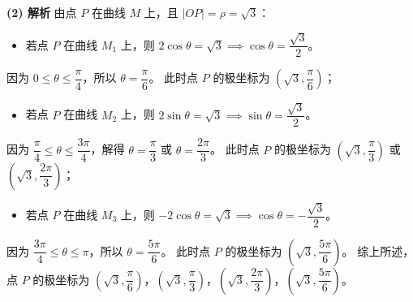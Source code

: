 \begin{answer}
\textbf{(2) 解析}
由点 $P$ 在曲线 $M$ 上，且 $|OP| = \rho = \sqrt{3}$：
\begin{itemize}
\item 若点 $P$ 在曲线 $M_1$ 上，则 $2\cos\theta = \sqrt{3} \implies \cos\theta = \dfrac{\sqrt{3}}{2}$。
\end{itemize}
  因为 $0 \leqslant \theta \leqslant \dfrac{\pi}{4}$，所以 $\theta = \dfrac{\pi}{6}$。
  此时点 $P$ 的极坐标为 $\left(\sqrt{3}, \dfrac{\pi}{6}\right)$；
\begin{itemize}
\item 若点 $P$ 在曲线 $M_2$ 上，则 $2\sin\theta = \sqrt{3} \implies \sin\theta = \dfrac{\sqrt{3}}{2}$。
\end{itemize}
  因为 $\dfrac{\pi}{4} \leqslant \theta \leqslant \dfrac{3\pi}{4}$，解得 $\theta = \dfrac{\pi}{3}$ 或 $\theta = \dfrac{2\pi}{3}$。
  此时点 $P$ 的极坐标为 $\left(\sqrt{3}, \dfrac{\pi}{3}\right)$ 或 $\left(\sqrt{3}, \dfrac{2\pi}{3}\right)$；
\begin{itemize}
\item 若点 $P$ 在曲线 $M_3$ 上，则 $-2\cos\theta = \sqrt{3} \implies \cos\theta = -\dfrac{\sqrt{3}}{2}$。
\end{itemize}
  因为 $\dfrac{3\pi}{4} \leqslant \theta \leqslant \pi$，所以 $\theta = \dfrac{5\pi}{6}$。
  此时点 $P$ 的极坐标为 $\left(\sqrt{3}, \dfrac{5\pi}{6}\right)$。
综上所述，点 $P$ 的极坐标为 $\left(\sqrt{3}, \dfrac{\pi}{6}\right)$，$\left(\sqrt{3}, \dfrac{\pi}{3}\right)$，$\left(\sqrt{3}, \dfrac{2\pi}{3}\right)$，$\left(\sqrt{3}, \dfrac{5\pi}{6}\right)$。



\end{answer}
